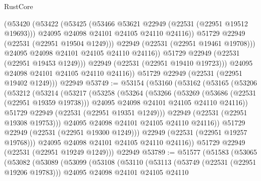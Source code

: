\begin{lexlean}{RustCore}
\begin{coremodule}
                    (@53420
                      (@53422
                        (@53425
                          (@53466 @53621 @22949 (@22531 (@22951 @19512 @19693)))
                          @24095
                          @24098
                          @24101
                          @24105
                          @24110
                          @24116))
                      @51729
                      @22949
                      (@22531 (@22951 @19504 @1249)))
                    @22949
                    (@22531 (@22951 @19461 @19708)))
                  @24095
                  @24098
                  @24101
                  @24105
                  @24110
                  @24116))
              @51729
              @22949
              (@22531 (@22951 @19453 @1249)))
            @22949
            (@22531 (@22951 @19410 @19723)))
          @24095
          @24098
          @24101
          @24105
          @24110
          @24116))
      @51729
      @22949
      (@22531 (@22951 @19402 @1249)))
    @22949
@53749 := @53154
    (@53160
      (@53162
        (@53165
          (@53206
            (@53212
              (@53214
                (@53217
                  (@53258
                    (@53264
                      (@53266
                        (@53269
                          (@53686 (@22531 (@22951 @19359 @19738)))
                          @24095
                          @24098
                          @24101
                          @24105
                          @24110
                          @24116))
                      @51729
                      @22949
                      (@22531 (@22951 @19351 @1249)))
                    @22949
                    (@22531 (@22951 @19308 @19753)))
                  @24095
                  @24098
                  @24101
                  @24105
                  @24110
                  @24116))
              @51729
              @22949
              (@22531 (@22951 @19300 @1249)))
            @22949
            (@22531 (@22951 @19257 @19768)))
          @24095
          @24098
          @24101
          @24105
          @24110
          @24116))
      @51729
      @22949
      (@22531 (@22951 @19249 @1249)))
    @22949
@53789 := @51577
    (@51583
      (@53065
        (@53082
          (@53089
            (@53099
              (@53108
                (@53110
                  (@53113
                    (@53749 (@22531 (@22951 @19206 @19783)))
                    @24095
                    @24098
                    @24101
                    @24105
                    @24110

\end{coremodule}
\end{lexlean}
